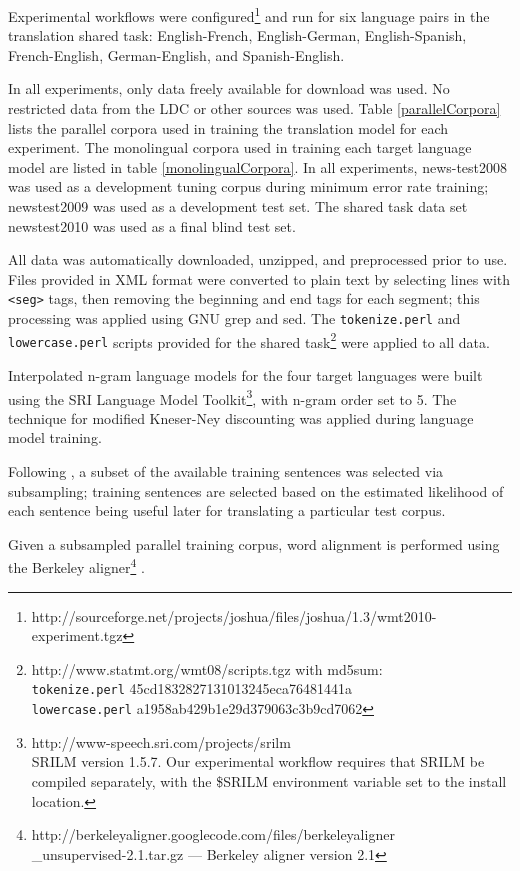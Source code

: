 \documentclass[11pt, a4paper]{article}
\begin{document}
Experimental workflows were configured\footnote{http://sourceforge.net/projects/joshua/files/joshua/1.3/wmt2010-experiment.tgz} and run for six language pairs in the translation shared task: English-French, English-German, English-Spanish, French-English, German-English, and Spanish-English. 

In all experiments, only data freely available for download was used. No restricted data from the LDC or other sources was used. Table \ref{parallelCorpora} lists the parallel corpora used in training the translation model for each experiment. The monolingual corpora used in training each target language model are listed in table \ref{monolingualCorpora}. In all experiments, news-test2008 was used as a development tuning corpus during minimum error rate training; newstest2009 was used as a development test set. The shared task data set newstest2010 was used as a final blind test set.

All data was automatically downloaded, unzipped, and preprocessed prior to use. Files provided in XML format were converted to plain text by selecting lines with {\tt <seg>} tags, then removing the beginning and end tags for each segment; this processing was applied using GNU grep and sed. The {\tt tokenize.perl} and {\tt lowercase.perl} scripts provided for the shared task\footnote{http://www.statmt.org/wmt08/scripts.tgz with md5sum: \\ {\tt tokenize.perl} 45cd1832827131013245eca76481441a \\ {\tt lowercase.perl} a1958ab429b1e29d379063c3b9cd7062} were applied to all data.

Interpolated n-gram language models for the four target languages were built using the SRI Language Model Toolkit\footnote{ http://www-speech.sri.com/projects/srilm \\ SRILM version 1.5.7. Our experimental workflow requires that SRILM be compiled separately, with the \$SRILM environment variable set to the install location.}, with n-gram order set to 5. The  technique for modified Kneser-Ney discounting \cite{Kneser1995} was applied during language model training.

Following , a subset of the available training sentences was selected via subsampling; training sentences are selected based on the estimated likelihood of each sentence being useful later for translating a particular test corpus. 


Given a subsampled parallel training corpus, word alignment is performed using the Berkeley aligner\footnote{http://berkeleyaligner.googlecode.com/files/berkeleyaligner\\\_unsupervised-2.1.tar.gz --- Berkeley aligner version 2.1} \cite{liang06alignment}. 
\end{document}

